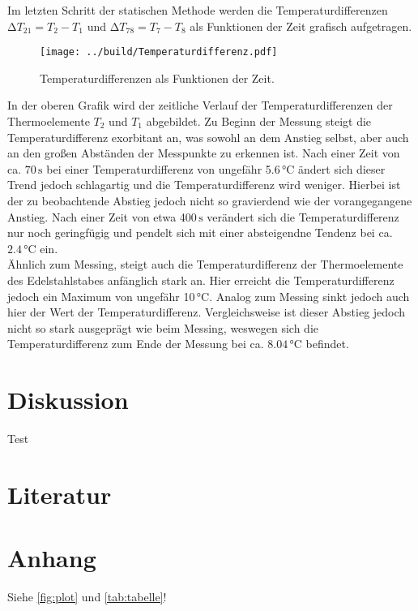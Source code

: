 Im letzten Schritt der statischen Methode werden die Temperaturdifferenzen $\increment T_{21} = T_2 - T_1$ und
$\increment T_{78} = T_7 - T_8$
als Funktionen der Zeit grafisch aufgetragen.

\begin{figure}
  \centering
  \texttt{[image: ../build/Temperaturdifferenz.pdf]}
  \caption{Temperaturdifferenzen als Funktionen der Zeit.}
  \label{fig:statisch3}
\end{figure}

In der oberen Grafik wird der zeitliche Verlauf der Temperaturdifferenzen der Thermoelemente $T_2$ und $T_1$ abgebildet.
Zu Beginn der Messung steigt die Temperaturdifferenz exorbitant an, was sowohl an dem Anstieg selbst, aber auch an den 
großen Abständen der Messpunkte zu erkennen ist. Nach einer Zeit von ca. $70\,\unit{\second}$ bei einer Temperaturdifferenz von ungefähr 5.6\,\unit{\celsius} ändert sich dieser Trend jedoch
schlagartig und die Temperaturdifferenz wird weniger. Hierbei ist der zu beobachtende Abstieg jedoch nicht so gravierdend wie
der vorangegangene Anstieg. Nach einer Zeit von etwa 400\,$\unit{\second}$ verändert sich die Temperaturdifferenz nur noch 
geringfügig und pendelt sich mit einer absteigendne Tendenz bei ca.$2.4\,\unit{\celsius}$ ein.\\
Ähnlich zum Messing, steigt auch die Temperaturdifferenz der Thermoelemente des Edelstahlstabes anfänglich stark an. Hier erreicht die 
Temperaturdifferenz jedoch ein Maximum von ungefähr 10\,$\unit{\celsius}$. Analog zum Messing sinkt jedoch auch hier der Wert der 
Temperaturdifferenz. Vergleichsweise ist dieser Abstieg jedoch nicht so stark ausgeprägt wie beim Messing, weswegen sich die Temperaturdifferenz
zum Ende der Messung bei ca. $8.04\,\unit{\celsius}$ befindet.

\section{Diskussion}
Test
\section{Literatur}

\section{Anhang}
Siehe \autoref{fig:plot} und \autoref{tab:tabelle}!


